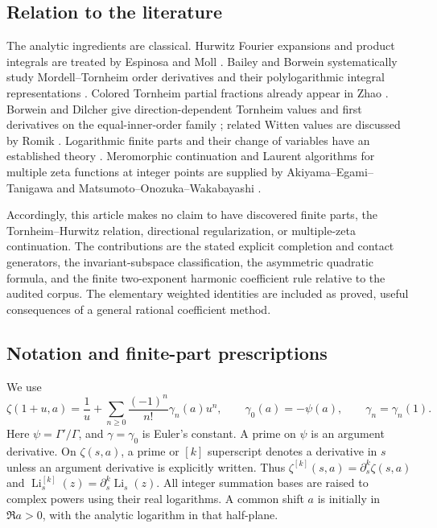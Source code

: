 \documentclass[11pt,a4paper]{article}
\theoremstyle{definition}
\theoremstyle{remark}
\DeclareMathOperator{\Li}{Li}
\numberwithin{equation}{section}
\begin{document}
\subsection{Relation to the literature}

The analytic ingredients are classical. Hurwitz Fourier expansions
and product integrals are treated by Espinosa and Moll
\cite{EM2002,EM2006}. Bailey and Borwein systematically study
Mordell--Tornheim order derivatives and their polylogarithmic integral
representations \cite{BB2014}. Colored Tornheim partial fractions already appear
in Zhao \cite{sp:Zhao}. Borwein and Dilcher give direction-dependent
Tornheim values and first derivatives on the equal-inner-order family
\cite{BorweinDilcher}; related Witten values are discussed by Romik
\cite{sp:Romik}. Logarithmic finite parts and their change of variables
have an established theory \cite{Latt2011}. Meromorphic continuation
and Laurent algorithms for multiple zeta functions at integer points
are supplied by Akiyama--Egami--Tanigawa and
Matsumoto--Onozuka--Wakabayashi \cite{h2:AET,h2:MOW}.

Accordingly, this article makes no claim to have discovered finite
parts, the Tornheim--Hurwitz relation, directional regularization, or
multiple-zeta continuation. The contributions are the stated explicit
completion and contact generators, the invariant-subspace
classification, the asymmetric quadratic formula, and the finite
two-exponent harmonic coefficient rule relative to the audited corpus.
The elementary weighted identities are included as proved, useful
consequences of a general rational coefficient method.

\subsection{Notation and finite-part prescriptions}

We use
\begin{equation}\label{scope:stieltjes}
 \zeta(1+u,a)=\frac1u+
       \sum_{n\ge0}\frac{(-1)^n}{n!}\gamma_n(a)u^n,
 \qquad \gamma_0(a)=-\psi(a),
 \qquad \gamma_n=\gamma_n(1).
\end{equation}
Here $\psi=\Gamma'/\Gamma$, and $\gamma=\gamma_0$ is Euler's
constant. A prime on $\psi$ is an argument derivative. On $\zeta(s,a)$,
a prime or $[k]$ superscript denotes a derivative in $s$ unless an
argument derivative is explicitly written. Thus
$\zeta^{[k]}(s,a)=\partial_s^k\zeta(s,a)$ and
$\Li_s^{[k]}(z)=\partial_s^k\Li_s(z)$.
All integer summation bases are raised to complex powers using their
real logarithms. A common shift $a$ is initially in $\Re a>0$, with the
analytic logarithm in that half-plane.
\end{document}
